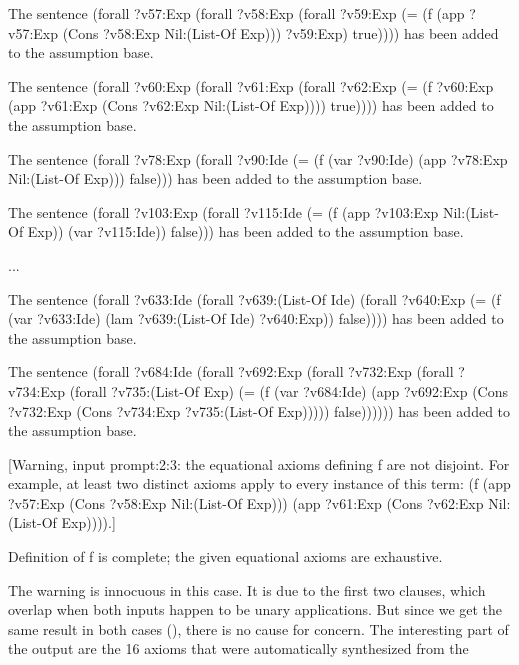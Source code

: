 \begin{tcAthena}
The sentence 
(forall ?v57:Exp
  (forall ?v58:Exp
    (forall ?v59:Exp
      (= (f (app ?v57:Exp
                 (Cons ?v58:Exp
                       Nil:(List-Of Exp)))
            ?v59:Exp)
         true))))
has been added to the assumption base.

The sentence 
(forall ?v60:Exp
  (forall ?v61:Exp
    (forall ?v62:Exp
      (= (f ?v60:Exp
            (app ?v61:Exp
                 (Cons ?v62:Exp
                       Nil:(List-Of Exp))))
         true))))
has been added to the assumption base.

The sentence 
(forall ?v78:Exp
  (forall ?v90:Ide
    (= (f (var ?v90:Ide)
          (app ?v78:Exp
               Nil:(List-Of Exp)))
       false)))
has been added to the assumption base.

The sentence 
(forall ?v103:Exp
  (forall ?v115:Ide
    (= (f (app ?v103:Exp
               Nil:(List-Of Exp))
          (var ?v115:Ide))
       false)))
has been added to the assumption base.

...

The sentence 
(forall ?v633:Ide
  (forall ?v639:(List-Of Ide)
    (forall ?v640:Exp
      (= (f (var ?v633:Ide)
            (lam ?v639:(List-Of Ide)
                 ?v640:Exp))
         false))))
has been added to the assumption base.

The sentence 
(forall ?v684:Ide
  (forall ?v692:Exp
    (forall ?v732:Exp
      (forall ?v734:Exp
        (forall ?v735:(List-Of Exp)
          (= (f (var ?v684:Ide)
                (app ?v692:Exp
                     (Cons ?v732:Exp
                           (Cons ?v734:Exp
                                 ?v735:(List-Of Exp)))))
             false))))))
has been added to the assumption base.

[Warning, input prompt:2:3: the equational axioms defining f are not disjoint.
For example, at least  two distinct axioms apply to every instance of this term:
(f (app ?v57:Exp (Cons ?v58:Exp Nil:(List-Of Exp))) 
   (app ?v61:Exp (Cons ?v62:Exp Nil:(List-Of Exp)))).]

Definition of f is complete; the given equational axioms are exhaustive.
\end{tcAthena}
The warning is innocuous in this case. It is due to the first two clauses,
which overlap when both inputs happen to be unary applications.
But since we get the same result in both cases (), 
there is no cause for concern. The interesting part of the output
are the 16 axioms that were automatically synthesized from the
